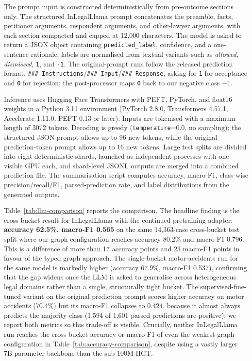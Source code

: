 \documentclass[runningheads]{llncs}
\begin{document}
The prompt input is constructed deterministically from pre-outcome sections only. The structured InLegalLlama prompt concatenates the preamble, facts, petitioner arguments, respondent arguments, and other-lawyer arguments, with each section compacted and capped at 12{,}000 characters. The model is asked to return a JSON object containing \texttt{predicted\_label}, confidence, and a one-sentence rationale; labels are normalised from textual variants such as \emph{allowed}, \emph{dismissed}, \texttt{1}, and \texttt{-1}. The original-prompt runs follow the released prediction format, \texttt{\#\#\# Instructions}/\texttt{\#\#\# Input}/\texttt{\#\#\# Response}, asking for \texttt{1} for acceptance and \texttt{0} for rejection; the post-processor maps \texttt{0} back to our negative class $-1$.

Inference uses Hugging Face Transformers with PEFT, PyTorch, and float16 weights in a Python 3.11 environment (PyTorch 2.8.0, Transformers 4.57.1, Accelerate 1.11.0, PEFT 0.13 or later). Inputs are tokenised with a maximum length of 3072 tokens. Decoding is greedy (\texttt{temperature}=0.0, no sampling); the structured JSON prompt allows up to 96 new tokens, while the original prediction-token prompt allows up to 16 new tokens. Large test splits are divided into eight deterministic shards, launched as independent processes with one visible GPU each, and shard-level JSONL outputs are merged into a combined prediction file. The summarisation script computes accuracy, macro-F1, class-wise precision/recall/F1, parsed-prediction rate, and label distributions from the generated outputs.

Table~\ref{tab:llm-comparison} reports the comparison. The headline finding is the cross-bucket result for InLegalLlama with the continued-pretraining adapter: \textbf{accuracy 62.5\%, macro-F1 0.565} on the same 14{,}363-case cross-bucket test split where our graph configuration reaches accuracy 80.2\% and macro-F1 0.796. This is a difference of more than 17 accuracy points and 23 macro-F1 points in favour of the typed graph approach. The single-bucket motor-accidents run for the same model is markedly higher (accuracy 67.9\%, macro-F1 0.537), confirming that the gap widens once the LLM is asked to generalise across heterogeneous legal domains rather than a single, structurally tight bucket. The supervised-fine-tuned variant on the original prediction prompt scores higher accuracy on motor accidents (70.4\%) but its macro-F1 collapses to 0.424, because it almost always predicts the majority class (1{,}594 of 1{,}601 parsed predictions are positive); we report both metrics so this trade-off is visible. Crucially, neither InLegalLlama run reaches the cross-bucket accuracy or macro-F1 of even the weakest graph configuration in Table~\ref{tab:accuracy-comparison}, despite using a vastly larger 7B-parameter backbone than the sub-100M HGT.
\end{document}
